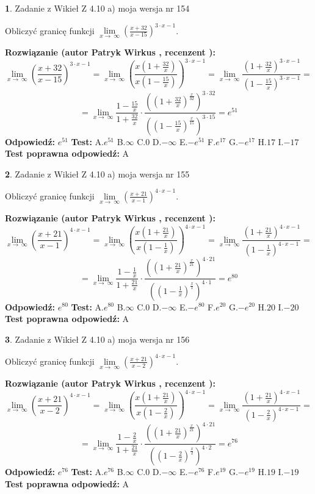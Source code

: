 \documentclass[12pt, a4paper]{article}
\theoremstyle{definition} %
\newtheorem{zad}{}
\newcommand{\zadStart}[1]{\begin{zad}#1\newline}
\newcommand{\zadStop}{\end{zad}}
\newcommand{\rozwStart}[2]{\noindent \textbf{Rozwiązanie (autor #1 , recenzent #2): }\newline}
\newcommand{\rozwStop}{\newline}
\newcommand{\odpStart}{\noindent \textbf{Odpowiedź:}\newline}
\newcommand{\odpStop}{\newline}
\newcommand{\testStart}{\noindent \textbf{Test:}\newline}
\newcommand{\testStop}{\newline}
\newcommand{\kluczStart}{\noindent \textbf{Test poprawna odpowiedź:}\newline}
\newcommand{\kluczStop}{\newline}
\begin{document}
\zadStart{Zadanie z Wikieł Z 4.10 a) moja wersja nr 154}

Obliczyć granicę funkcji  $\lim\limits_{x\to\ \infty}(\frac{x+32}{x-15})^{3\cdot x-1}$.
\zadStop
\rozwStart{Patryk Wirkus}{}
$$\lim\limits_{x\to\ \infty}(\frac{x+32}{x-15})^{3\cdot x-1} = \lim\limits_{x\to\ \infty}(\frac{x(1+\frac{32}{x})}{x(1-\frac{15}{x})})^{3\cdot x-1}=\lim\limits_{x\to\ \infty}\frac{(1+\frac{32}{x})^{3\cdot x-1}}{(1-\frac{15}{x})^{3\cdot x-1}}=$$
$$=\lim\limits_{x\to\ \infty}\frac{1-\frac{15}{x}}{1+\frac{32}{x}}\cdot\frac{((1+\frac{32}{x})^{\frac{x}{32}})^{3\cdot32}}{((1-\frac{15}{x})^{\frac{x}{15}})^{3\cdot15}}=e^{51}$$
\rozwStop
\odpStart
$e^{51}$
\odpStop
\testStart
A.$e^{51}$ B.$\infty$ C.$0$ D.$-\infty$ E.$-e^{51}$
F.$e^{17}$ G.$-e^{17}$
H.$17$
I.$-17$
\testStop
\kluczStart
A
\kluczStop



\zadStart{Zadanie z Wikieł Z 4.10 a) moja wersja nr 155}

Obliczyć granicę funkcji  $\lim\limits_{x\to\ \infty}(\frac{x+21}{x-1})^{4\cdot x-1}$.
\zadStop
\rozwStart{Patryk Wirkus}{}
$$\lim\limits_{x\to\ \infty}(\frac{x+21}{x-1})^{4\cdot x-1} = \lim\limits_{x\to\ \infty}(\frac{x(1+\frac{21}{x})}{x(1-\frac{1}{x})})^{4\cdot x-1}=\lim\limits_{x\to\ \infty}\frac{(1+\frac{21}{x})^{4\cdot x-1}}{(1-\frac{1}{x})^{4\cdot x-1}}=$$
$$=\lim\limits_{x\to\ \infty}\frac{1-\frac{1}{x}}{1+\frac{21}{x}}\cdot\frac{((1+\frac{21}{x})^{\frac{x}{21}})^{4\cdot21}}{((1-\frac{1}{x})^{\frac{x}{1}})^{4\cdot1}}=e^{80}$$
\rozwStop
\odpStart
$e^{80}$
\odpStop
\testStart
A.$e^{80}$ B.$\infty$ C.$0$ D.$-\infty$ E.$-e^{80}$
F.$e^{20}$ G.$-e^{20}$
H.$20$
I.$-20$
\testStop
\kluczStart
A
\kluczStop



\zadStart{Zadanie z Wikieł Z 4.10 a) moja wersja nr 156}

Obliczyć granicę funkcji  $\lim\limits_{x\to\ \infty}(\frac{x+21}{x-2})^{4\cdot x-1}$.
\zadStop
\rozwStart{Patryk Wirkus}{}
$$\lim\limits_{x\to\ \infty}(\frac{x+21}{x-2})^{4\cdot x-1} = \lim\limits_{x\to\ \infty}(\frac{x(1+\frac{21}{x})}{x(1-\frac{2}{x})})^{4\cdot x-1}=\lim\limits_{x\to\ \infty}\frac{(1+\frac{21}{x})^{4\cdot x-1}}{(1-\frac{2}{x})^{4\cdot x-1}}=$$
$$=\lim\limits_{x\to\ \infty}\frac{1-\frac{2}{x}}{1+\frac{21}{x}}\cdot\frac{((1+\frac{21}{x})^{\frac{x}{21}})^{4\cdot21}}{((1-\frac{2}{x})^{\frac{x}{2}})^{4\cdot2}}=e^{76}$$
\rozwStop
\odpStart
$e^{76}$
\odpStop
\testStart
A.$e^{76}$ B.$\infty$ C.$0$ D.$-\infty$ E.$-e^{76}$
F.$e^{19}$ G.$-e^{19}$
H.$19$
I.$-19$
\testStop
\kluczStart
A
\kluczStop
\end{document}
